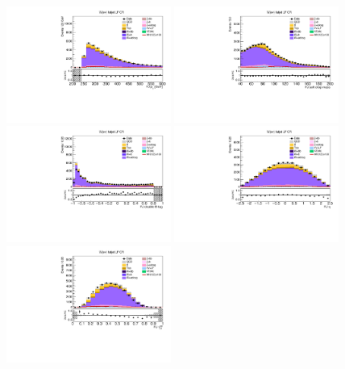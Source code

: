 \begin{figure}[tbp]
  \begin{center}
    \includegraphics[width=0.48\textwidth]{figures/wlnhbb2016/boosted/WenWHLightFlavorFJCR_fj1Pt.pdf}
    \includegraphics[width=0.48\textwidth]{figures/wlnhbb2016/boosted/WenWHLightFlavorFJCR_fj1MSD_corr.pdf}
    \includegraphics[width=0.48\textwidth]{figures/wlnhbb2016/boosted/WenWHLightFlavorFJCR_fj1DoubleCSV.pdf}
    \includegraphics[width=0.48\textwidth]{figures/wlnhbb2016/boosted/WenWHLightFlavorFJCR_fj1Eta.pdf}
    \includegraphics[width=0.48\textwidth]{figures/wlnhbb2016/boosted/WenWHLightFlavorFJCR_fj1Tau21SD.pdf}

\end{center}
\end{figure}
